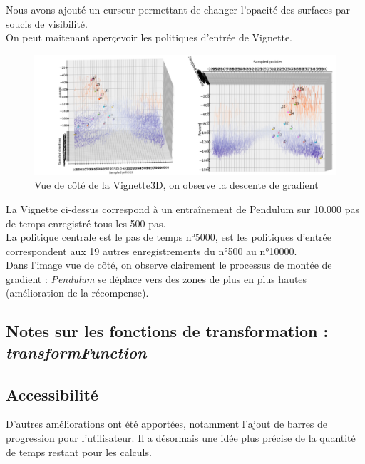 \documentclass[12pt]{article}
\begin{document}
Nous avons ajouté un curseur permettant de changer l'opacité des surfaces par soucis de visibilité. \\

On peut maitenant aperçevoir les politiques d'entrée de Vignette. \\

\begin{figure}[htp]
    \centering
    \includegraphics[width=15cm]{Images/vignette_cote}
    \caption{Vue de côté de la Vignette3D, on observe la descente de gradient}
    \label{fig:vignetteCote}
\end{figure}

\newpage
La Vignette ci-dessus correspond à un entraînement de Pendulum sur 10.000 pas de temps enregistré tous les 500 pas. \\

La politique centrale est le pas de temps n°5000, est les politiques d'entrée correspondent aux 19 autres enregistrements du n°500 au n°10000. \\

Dans l'image vue de côté, on observe clairement le processus de montée de gradient : \emph{Pendulum} se déplace vers des zones de plus en plus hautes (amélioration de la récompense). \\

\subsection{Notes sur les fonctions de transformation : \emph{transformFunction}}


\subsection{Accessibilité}

D’autres améliorations ont été apportées, notamment l’ajout de barres de progression pour l’utilisateur. Il a désormais une idée plus précise de la quantité de temps restant pour les calculs. \\
\end{document}

